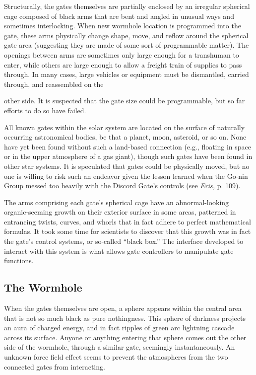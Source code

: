 Structurally, the gates themselves are partially enclosed by an irregular spherical cage composed of black arms that are bent and angled in unusual ways and sometimes interlocking. When new wormhole location is programmed into the gate, these arms physically change shape, move, and reflow around the spherical gate area (suggesting they are made of some sort of programmable matter). The openings between arms are sometimes only large enough for a transhuman to enter, while others are large enough to allow a freight train of supplies to pass through. In many cases, large vehicles or equipment must be dismantled, carried through, and reassembled on the 

other side. It is suspected that the gate size could be programmable, but so far efforts to do so have failed. 

All known gates within the solar system are located on the surface of naturally occurring astronomical bodies, be that a planet, moon, asteroid, or so on. None have yet been found without such a land-based connection (e.g., floating in space or in the upper atmosphere of a gas giant), though such gates have been found in other star systems. It is speculated that gates could be physically moved, but no one is willing to risk such an endeavor given the lesson learned when the Go-nin Group messed too heavily with the Discord Gate's controls (see \textit{Eris, }p. 109). 

The arms comprising each gate's spherical cage have an abnormal-looking organic-seeming growth on their exterior surface in some areas, patterned in entrancing twists, curves, and whorls that in fact adhere to perfect mathematical formulas. It took some time for scientists to discover that this growth was in fact the gate's control systems, or so-called ``black box.'' The interface developed to interact with this system is what allows gate controllers to manipulate gate functions. 

\subsection{The Wormhole} 

When the gates themselves are open, a sphere appears within the central area that is not so much black as pure nothingness. This sphere of darkness projects an aura of charged energy, and in fact ripples of green arc lightning cascade across its surface. Anyone or anything entering that sphere comes out the other side of the wormhole, through a similar gate, seemingly instantaneously. An unknown force field effect seems to prevent the atmospheres from the two connected gates from interacting. 

